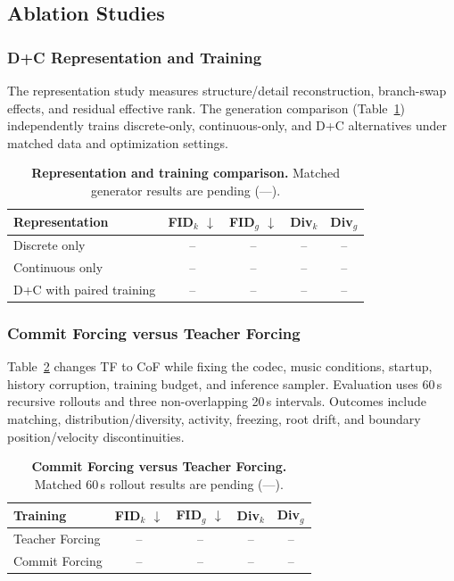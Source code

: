 \subsection{Ablation Studies}
\label{sec:ablations}
\subsubsection{D+C Representation and Training}
\label{sec:dc_results}
The representation study measures structure/detail reconstruction, branch-swap
effects, and residual effective rank. The generation comparison
(Table~\ref{tab:dc}) independently trains discrete-only, continuous-only,
and D+C alternatives under matched data and optimization settings.
\begin{table}[t]
\centering\small
\caption{\textbf{Representation and training comparison.} Matched generator results are pending (---).}
\label{tab:dc}
\setlength{\tabcolsep}{3pt}
\begin{tabular}{@{}lcccc@{}}\toprule
Representation & FID$_k$ $\downarrow$ & FID$_g$ $\downarrow$ & Div$_k$ & Div$_g$\\\midrule
Discrete only & -- & -- & -- & --\\
Continuous only & -- & -- & -- & --\\
D+C with paired training & -- & -- & -- & --\\\bottomrule
\end{tabular}
\end{table}

\subsubsection{Commit Forcing versus Teacher Forcing}
\label{sec:cof_results}
Table~\ref{tab:cof} changes TF to CoF while fixing the codec, music conditions,
startup, history corruption, training budget, and inference sampler.
Evaluation uses 60\,s recursive rollouts and three non-overlapping 20\,s
intervals. Outcomes include matching, distribution/diversity, activity,
freezing, root drift, and boundary position/velocity discontinuities.
\begin{table}[t]
\centering\small
\caption{\textbf{Commit Forcing versus Teacher Forcing.} Matched 60\,s rollout results are pending (---).}
\label{tab:cof}
\setlength{\tabcolsep}{4pt}
\begin{tabular}{@{}lcccc@{}}\toprule
Training & FID$_k$ $\downarrow$ & FID$_g$ $\downarrow$ & Div$_k$ & Div$_g$\\\midrule
Teacher Forcing & -- & -- & -- & --\\
Commit Forcing & -- & -- & -- & --\\\bottomrule
\end{tabular}
\end{table}

